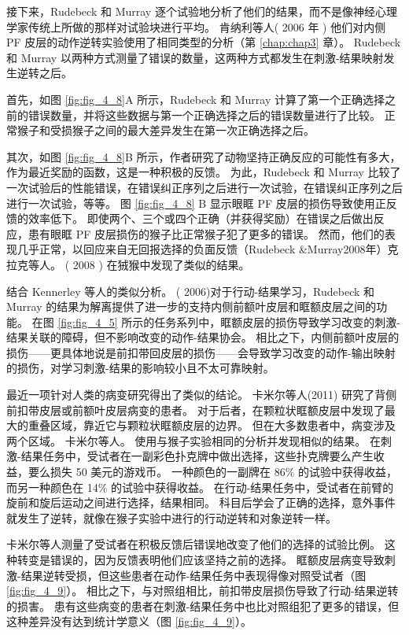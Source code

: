接下来，Rudebeck 和 Murray 逐个试验地分析了他们的结果，而不是像神经心理学家传统上所做的那样对试验块进行平均。
肯纳利等人( 2006 年 ) 他们对内侧 PF 皮层的动作逆转实验使用了相同类型的分析（第 \ref{chap:chap3} 章）。
Rudebeck 和 Murray 以两种方式测量了错误的数量，这两种方式都发生在刺激-结果映射发生逆转之后。\par


首先，如图 \ref{fig:fig_4_8}A 所示，Rudebeck 和 Murray 计算了第一个正确选择之前的错误数量，并将这些数据与第一个正确选择之后的错误数量进行了比较。
正常猴子和受损猴子之间的最大差异发生在第一次正确选择之后。\par


其次，如图 \ref{fig:fig_4_8}B 所示，作者研究了动物坚持正确反应的可能性有多大，作为最近奖励的函数，这是一种积极的反馈。
为此，Rudebeck 和 Murray 比较了一次试验后的性能错误，在错误纠正序列之后进行一次试验，在错误纠正序列之后进行一次试验，等等。
图 \ref{fig:fig_4_8} B 显示眼眶 PF 皮层的损伤导致使用正反馈的效率低下。
即使两个、三个或四个正确（并获得奖励）在错误之后做出反应，患有眼眶 PF 皮层损伤的猴子比正常猴子犯了更多的错误。
然而，他们的表现几乎正常，以回应来自无回报选择的负面反馈（Rudebeck \&Murray2008年）克拉克等人。
( 2008 ) 在狨猴中发现了类似的结果。\par


结合 Kennerley 等人的类似分析。 ( 2006)对于行动-结果学习，Rudebeck 和 Murray 的结果为解离提供了进一步的支持内侧前额叶皮层和眶额皮层之间的功能。
在图 \ref{fig:fig_4_5} 所示的任务系列中，眶额皮层的损伤导致学习改变的刺激-结果关联的障碍，但不影响改变的动作-结果协会。
相比之下，内侧前额叶皮层的损伤——更具体地说是前扣带回皮层的损伤——会导致学习改变的动作-输出映射的损伤，对学习刺激-结果的影响较小且不太可靠映射。\par


最近一项针对人类的病变研究得出了类似的结论。
卡米尔等人(2011) 研究了背侧前扣带皮层或前额叶皮层病变的患者。
对于后者，在颗粒状眶额皮层中发现了最大的重叠区域，靠近它与颗粒状眶额皮层的边界。
但在大多数患者中，病变涉及两个区域。
卡米尔等人。 使用与猴子实验相同的分析并发现相似的结果。
在刺激-结果任务中，受试者在一副彩色扑克牌中做出选择，这些扑克牌要么产生收益，要么损失 50 美元的游戏币。
一种颜色的一副牌在 86\% 的试验中获得收益，而另一种颜色在 14\% 的试验中获得收益。
在行动-结果任务中，受试者在前臂的旋前和旋后运动之间进行选择，结果相同。
科目后学会了正确的选择，意外事件就发生了逆转，就像在猴子实验中进行的行动逆转和对象逆转一样。\par


卡米尔等人测量了受试者在积极反馈后错误地改变了他们的选择的试验比例。
这种转变是错误的，因为反馈表明他们应该坚持之前的选择。
眶额皮层病变导致刺激-结果逆转受损，但这些患者在动作-结果任务中表现得像对照受试者（图 \ref{fig:fig_4_9}）。
相比之下，与对照组相比，前扣带皮层损伤导致了行动-结果逆转的损害。
患有这些病变的患者在刺激-结果任务中也比对照组犯了更多的错误，但这种差异没有达到统计学意义（图 \ref{fig:fig_4_9}）。\par


